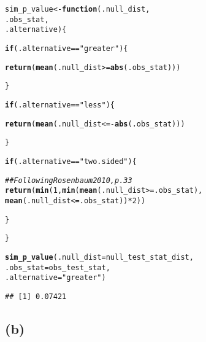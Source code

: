 \documentclass[11pt]{article}\usepackage[]{graphicx}\usepackage[]{color}
\makeatletter
\newcommand{\hlnum}[1]{\textcolor[rgb]{0.686,0.059,0.569}{#1}}%
\newcommand{\hlstr}[1]{\textcolor[rgb]{0.192,0.494,0.8}{#1}}%
\newcommand{\hlcom}[1]{\textcolor[rgb]{0.678,0.584,0.686}{\textit{#1}}}%
\newcommand{\hlopt}[1]{\textcolor[rgb]{0,0,0}{#1}}%
\newcommand{\hlstd}[1]{\textcolor[rgb]{0.345,0.345,0.345}{#1}}%
\newcommand{\hlkwa}[1]{\textcolor[rgb]{0.161,0.373,0.58}{\textbf{#1}}}%
\newcommand{\hlkwb}[1]{\textcolor[rgb]{0.69,0.353,0.396}{#1}}%
\newcommand{\hlkwc}[1]{\textcolor[rgb]{0.333,0.667,0.333}{#1}}%
\newcommand{\hlkwd}[1]{\textcolor[rgb]{0.737,0.353,0.396}{\textbf{#1}}}%
\newenvironment{kframe}{%
 \def\at@end@of@kframe{}%
 \ifinner\ifhmode%
  \def\at@end@of@kframe{\end{minipage}}%
  \begin{minipage}{\columnwidth}%
 \fi\fi%
 \def\FrameCommand##1{\hskip\@totalleftmargin \hskip-\fboxsep
 \colorbox{shadecolor}{##1}\hskip-\fboxsep
     \hskip-\linewidth \hskip-\@totalleftmargin \hskip\columnwidth}%
 \MakeFramed {\advance\hsize-\width
   \@totalleftmargin\z@ \linewidth\hsize
   \@setminipage}}%
 {\par\unskip\endMakeFramed%
 \at@end@of@kframe}
\newenvironment{knitrout}{}{} %
\theoremstyle{newstyle}
\makeatother
\begin{document}
\begin{knitrout}
\color{fgcolor}\begin{kframe}
\begin{alltt}
\hlstd{sim_p_value} \hlkwb{<-} \hlkwa{function}\hlstd{(}\hlkwc{.null_dist}\hlstd{,}
                        \hlkwc{.obs_stat}\hlstd{,}
                        \hlkwc{.alternative}\hlstd{)\{}

  \hlkwa{if}\hlstd{(.alternative} \hlopt{==} \hlstr{"greater"}\hlstd{) \{}

    \hlkwd{return}\hlstd{(}\hlkwd{mean}\hlstd{(.null_dist} \hlopt{>=} \hlkwd{abs}\hlstd{(.obs_stat)))}

  \hlstd{\}}

  \hlkwa{if}\hlstd{(.alternative} \hlopt{==} \hlstr{"less"}\hlstd{) \{}


    \hlkwd{return}\hlstd{(}\hlkwd{mean}\hlstd{(.null_dist} \hlopt{<= -}\hlkwd{abs}\hlstd{(.obs_stat)))}

  \hlstd{\}}

  \hlkwa{if}\hlstd{(.alternative} \hlopt{==} \hlstr{"two.sided"}\hlstd{)\{}

    \hlcom{## Following Rosenbaum 2010, p. 33}
    \hlkwd{return}\hlstd{(}\hlkwd{min}\hlstd{(}\hlnum{1}\hlstd{,} \hlkwd{min}\hlstd{(}\hlkwd{mean}\hlstd{(.null_dist} \hlopt{>=} \hlstd{.obs_stat),}
               \hlkwd{mean}\hlstd{(.null_dist} \hlopt{<=} \hlstd{.obs_stat))} \hlopt{*} \hlnum{2}\hlstd{))}

  \hlstd{\}}

\hlstd{\}}

\hlkwd{sim_p_value}\hlstd{(}\hlkwc{.null_dist} \hlstd{= null_test_stat_dist,}
            \hlkwc{.obs_stat} \hlstd{= obs_test_stat,}
            \hlkwc{.alternative} \hlstd{=} \hlstr{"greater"}\hlstd{)}
\end{alltt}
\begin{verbatim}
## [1] 0.07421
\end{verbatim}
\end{kframe}
\end{knitrout}

\subsection{(b)}
\end{document}
